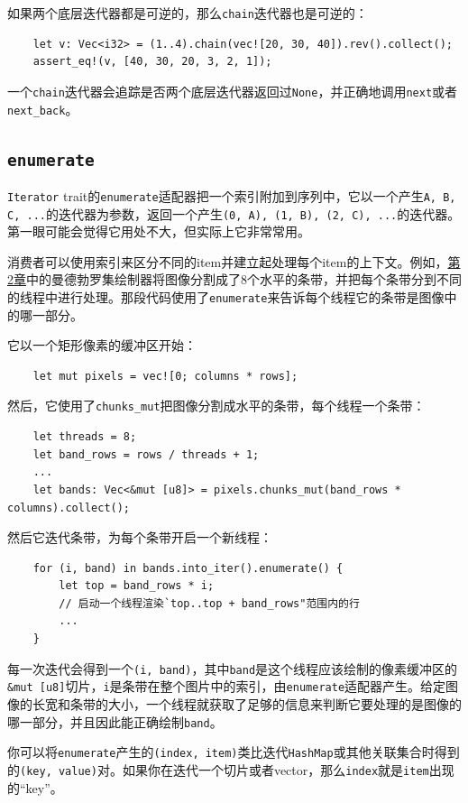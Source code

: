 如果两个底层迭代器都是可逆的，那么\texttt{chain}迭代器也是可逆的：
\begin{verbatim}
    let v: Vec<i32> = (1..4).chain(vec![20, 30, 40]).rev().collect();
    assert_eq!(v, [40, 30, 20, 3, 2, 1]);
\end{verbatim}

一个\texttt{chain}迭代器会追踪是否两个底层迭代器返回过\texttt{None}，并正确地调用\texttt{next}或者\texttt{next\_back}。

\subsection{\texttt{enumerate}}\label{enumerate}
\texttt{Iterator} trait的\texttt{enumerate}适配器把一个索引附加到序列中，它以一个产生\texttt{A, B, C, ...}的迭代器为参数，返回一个产生\texttt{(0, A), (1, B), (2, C), ...}的迭代器。第一眼可能会觉得它用处不大，但实际上它非常常用。

消费者可以使用索引来区分不同的item并建立起处理每个item的上下文。例如，\hyperref[ch02]{第2章}中的曼德勃罗集绘制器将图像分割成了8个水平的条带，并把每个条带分到不同的线程中进行处理。那段代码使用了\texttt{enumerate}来告诉每个线程它的条带是图像中的哪一部分。

它以一个矩形像素的缓冲区开始：
\begin{verbatim}
    let mut pixels = vec![0; columns * rows];
\end{verbatim}
然后，它使用了\texttt{chunks\_mut}把图像分割成水平的条带，每个线程一个条带：
\begin{verbatim}
    let threads = 8;
    let band_rows = rows / threads + 1;
    ...
    let bands: Vec<&mut [u8]> = pixels.chunks_mut(band_rows * columns).collect();
\end{verbatim}

然后它迭代条带，为每个条带开启一个新线程：
\begin{verbatim}
    for (i, band) in bands.into_iter().enumerate() {
        let top = band_rows * i;
        // 启动一个线程渲染`top..top + band_rows"范围内的行
        ...
    }
\end{verbatim}

每一次迭代会得到一个\texttt{(i, band)}，其中\texttt{band}是这个线程应该绘制的像素缓冲区的\texttt{\&mut [u8]}切片，\texttt{i}是条带在整个图片中的索引，由\texttt{enumerate}适配器产生。给定图像的长宽和条带的大小，一个线程就获取了足够的信息来判断它要处理的是图像的哪一部分，并且因此能正确绘制\texttt{band}。

你可以将\texttt{enumerate}产生的\texttt{(index, item)}类比迭代\texttt{HashMap}或其他关联集合时得到的\texttt{(key, value)}对。如果你在迭代一个切片或者vector，那么\texttt{index}就是\texttt{item}出现的“key”。


